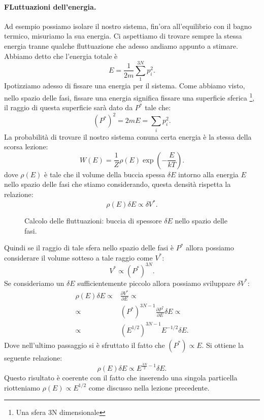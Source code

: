 \paragraph{FLuttuazioni dell'energia.}%
Ad esempio possiamo isolare il nostro sistema, fin'ora all'equilibrio con il bagno termico, misuriamo la sua energia. Ci aspettiamo di trovare sempre la stessa energia tranne qualche fluttuazione che adesso andiamo appunto a stimare. \\
Abbiamo detto che l'energia totale è
\[
	E = \frac{1}{2m}\sum_{1}^{3N} p_{i}^2
.\] 
Ipotizziamo adesso di fissare una energia per il sistema. Come abbiamo visto, nello spazio delle fasi, fissare una energia significa fissare una superficie sferica \footnote{Una sfera 3N dimensionale}, il raggio di questa superficie sarà dato da $P^{*}$ tale che:
\[
	\left( P^* \right)^2 = 2mE = \sum_{i}^{} p_{i}^2
.\] 
La probabilità di trovare il nostro sistema conuna certa energia è la stessa della scorsa lezione:
\[
	W\left( E \right) = \frac{1}{Z}\rho\left( E \right) \exp\left( -\frac{E}{kT} \right) 
.\] 
dove $\rho\left( E \right)$ è tale che il volume della buccia spessa $\delta E$ intorno alla energia $E$ nello spazio delle fasi che stiamo considerando, questa densità rispetta la relazione:
\[
	\rho\left( E \right) \delta E \propto \delta V^*
.\]
\begin{figure}[H]
    \centering
    \caption{Calcolo delle fluttuazioni: buccia di spessore $\delta E$ nello spazio delle fasi.}
    \label{fig:calcolo-delle-fluttuazioni}
\end{figure}
\noindent
Quindi se il raggio di tale sfera nello spazio delle fasi è $P^*$ allora possiamo considerare il volume sotteso a tale raggio come  $V^{*}$:
\[
	V^* \propto \left( P^* \right)^{3N}
.\] 
Se consideriamo un $\delta E$ sufficientemente piccolo allora possiamo sviluppare $\delta V^{*}$:
\begin{align}
	\rho\left( E \right) \delta E \propto& \frac{\partial V^*}{\partial E}  \propto\\
	\propto &\left( P^* \right) ^{3N-1}\frac{\partial P^*}{\partial E} \delta E \propto\\
	\propto &\left( E^{1 / 2} \right) ^{3N-1}E^{- 1 / 2} \delta E
.\end{align}
Dove nell'ultimo passaggio si è sfruttato il fatto che $\left( P^{*} \right) \propto E$. Si ottiene la seguente relazione: 
\[
	\rho\left( E \right) \delta E \propto E ^{\frac{3N}{2} -1}\delta E 
.\] 
Questo risultato è coerente con il fatto che inserendo una singola particella riotteniamo $\rho\left( E \right) \propto E^{1 /2}$ come discusso nella lezione precedente.\\
